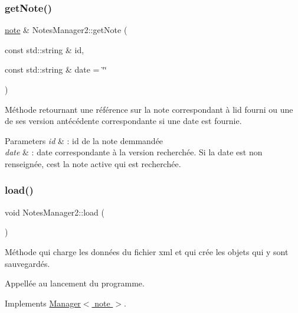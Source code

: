 \subsubsection{\texorpdfstring{get\+Note()}{getNote()}}
{\footnotesize\ttfamily \hyperlink{classnote}{note} \& Notes\+Manager2\+::get\+Note (\begin{DoxyParamCaption}\item[{const std\+::string \&}]{id,  }\item[{const std\+::string \&}]{date = {\ttfamily \char`\"{}\char`\"{}} }\end{DoxyParamCaption})}



Méthode retournant une référence sur la note correspondant à l\textquotesingle{}id fourni ou une de ses version antécédente correspondante si une date est fournie. 


\begin{DoxyParams}{Parameters}
{\em id} & \+: id de la note demmandée \\
\hline
{\em date} & \+: date correspondante à la version recherchée. Si la date est non renseignée, c\textquotesingle{}est la note active qui est recherchée. \\
\hline
\end{DoxyParams}
\mbox{\label{class_notes_manager2_a2248b5b1620b2039fdba9b3c6476c6cc}} 
\subsubsection{\texorpdfstring{load()}{load()}}
{\footnotesize\ttfamily void Notes\+Manager2\+::load (\begin{DoxyParamCaption}{ }\end{DoxyParamCaption})\hspace{0.3cm}{\ttfamily [virtual]}}



Méthode qui charge les données du fichier xml et qui crée les objets qui y sont sauvegardés. 

Appellée au lancement du programme. 

Implements \hyperlink{class_manager_add6a6361b3ebef4e6e744c2b12f9e57d}{Manager$<$ note $>$}.

\mbox{\label{class_notes_manager2_a03224a8a150d7d7a40a6633ab2afc7c0}} 
